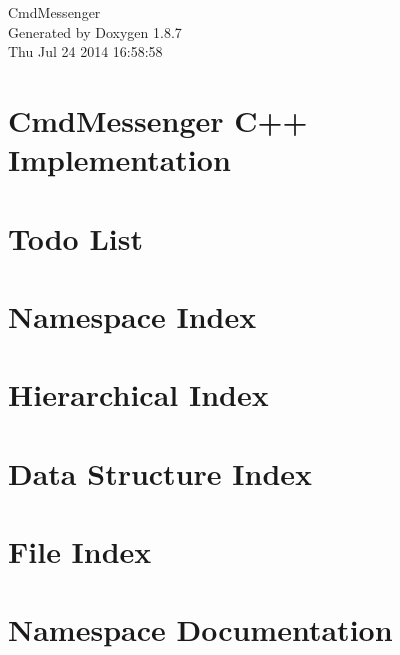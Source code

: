 \documentclass[twoside]{book}
\newcommand{\+}{\discretionary{\mbox{\scriptsize$\hookleftarrow$}}{}{}}
\newcommand{\clearemptydoublepage}{%
  \newpage{\pagestyle{empty}\cleardoublepage}%
}
\begin{document}
\hypersetup{pageanchor=false,
             bookmarks=true,
             bookmarksnumbered=true,
             pdfencoding=unicode
            }
\begin{titlepage}
\vspace*{7cm}
\begin{center}%
{\Large Cmd\+Messenger }\\
\vspace*{1cm}
{\large Generated by Doxygen 1.8.7}\\
\vspace*{0.5cm}
{\small Thu Jul 24 2014 16:58:58}\\
\end{center}
\end{titlepage}
\clearemptydoublepage
\tableofcontents
\clearemptydoublepage
{}
\hypersetup{pageanchor=true}

\chapter{Cmd\+Messenger C++ Implementation}
\label{index}\hypertarget{index}{}
\chapter{Todo List}
\label{todo}
\hypertarget{todo}{}

\chapter{Namespace Index}

\chapter{Hierarchical Index}

\chapter{Data Structure Index}

\chapter{File Index}

\chapter{Namespace Documentation}

\end{document}
